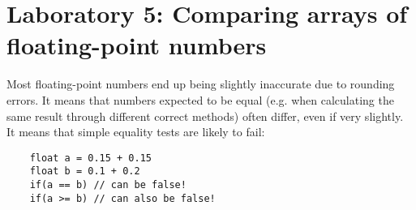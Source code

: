 \documentclass[english,a4paper,12pt,oneside]{article}
\begin{document}

\section*{Laboratory 5: Comparing arrays of floating-point numbers}

Most floating-point numbers end up being slightly inaccurate due to rounding errors. 
It means that numbers expected to be equal (e.g. when calculating the same result through different correct methods) often differ, even if very slightly. 
It means that simple equality tests are likely to fail:

\begin{lstlisting}
    float a = 0.15 + 0.15
    float b = 0.1 + 0.2
    if(a == b) // can be false!
    if(a >= b) // can also be false!
\end{lstlisting}

% 
% 
% 
% 
% 
% 
\end{document}
